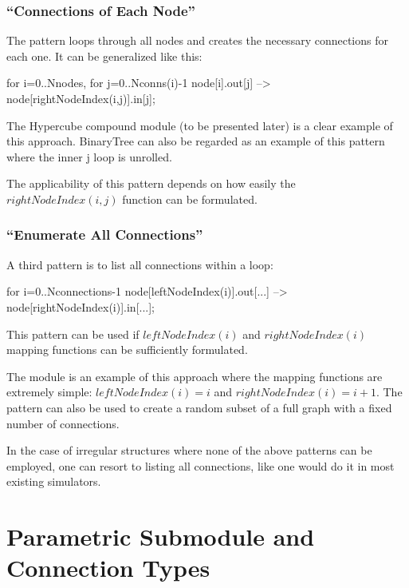\subsubsection{``Connections of Each Node''}
\label{sec:ned-lang:connections-of-each-node}

The pattern loops through all nodes and creates the necessary
connections for each one. It can be generalized like this:

\begin{ned}
for i=0..Nnodes, for j=0..Nconns(i)-1 {
    node[i].out[j] --> node[rightNodeIndex(i,j)].in[j];
}
\end{ned}

The Hypercube compound module (to be
presented later) is a clear example of this approach. BinaryTree can
also be regarded as an example of this pattern where the inner j loop
is unrolled.

The applicability of this pattern depends on how easily the $rightNodeIndex(i,j)$
function can be formulated.


\subsubsection{``Enumerate All Connections''}
\label{sec:ned-lang:enumerate-all-connections}


A third pattern is to list all connections within a loop:

\begin{ned}
for i=0..Nconnections-1 {
    node[leftNodeIndex(i)].out[...] --> node[rightNodeIndex(i)].in[...];
}
\end{ned}

This pattern can be used if $leftNodeIndex(i)$ and $rightNodeIndex(i)$
mapping functions can be sufficiently formulated.

The  module is an example of this approach where the mapping
functions are extremely simple: $leftNodeIndex(i)=i$ and $rightNodeIndex(i) = i+1$.
The pattern can also be used to create a random subset of a full
graph with a fixed number of connections.

In the case of irregular structures where none of the above patterns
can be employed, one can resort to listing all connections, like one
would do it in most existing simulators.



\section{Parametric Submodule and Connection Types}
\label{sec:ned-lang:parametric-submodule-and-connection-types}

